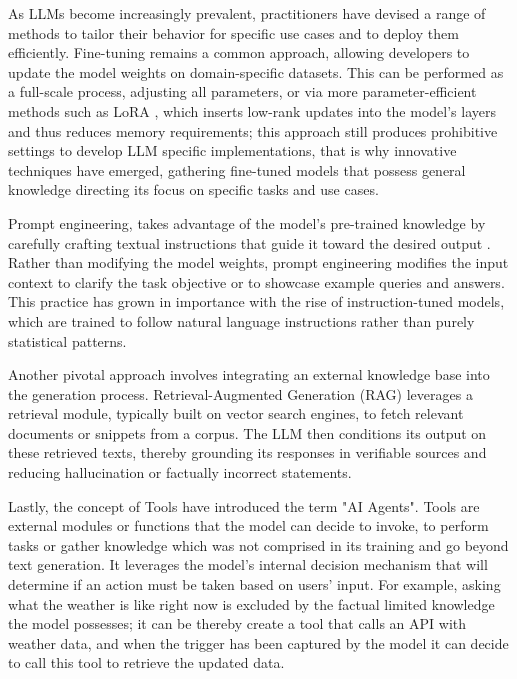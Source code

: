 As LLMs become increasingly prevalent, practitioners have devised a range of methods to tailor their behavior for specific use cases and to deploy them efficiently. Fine-tuning remains a common approach, allowing developers to update the model weights on domain-specific datasets. This can be performed as a full-scale process, adjusting all parameters, or via more parameter-efficient methods such as LoRA \cite{hu2021lora}, which inserts low-rank updates into the model’s layers and thus reduces memory requirements; this approach still produces prohibitive settings to develop LLM specific implementations, that is why innovative techniques have emerged, gathering fine-tuned models that possess general knowledge directing its focus on specific tasks and use cases.

Prompt engineering, takes advantage of the model’s pre-trained knowledge by carefully crafting textual instructions that guide it toward the desired output \cite{liu2023promptsurvey}. Rather than modifying the model weights, prompt engineering modifies the input context to clarify the task objective or to showcase example queries and answers. This practice has grown in importance with the rise of instruction-tuned models, which are trained to follow natural language instructions rather than purely statistical patterns.

Another pivotal approach involves integrating an external knowledge base into the generation process. Retrieval-Augmented Generation (RAG)\cite{lewis2020retrieval} leverages a retrieval module, typically built on vector search engines, to fetch relevant documents or snippets from a corpus. The LLM then conditions its output on these retrieved texts, thereby grounding its responses in verifiable sources and reducing hallucination or factually incorrect statements\cite{ji2023surveyhallucination}.

Lastly, the concept of Tools have introduced the term "AI Agents". Tools are external modules or functions that the model can decide to invoke, to perform tasks or gather knowledge which was not comprised in its training and go beyond text generation. It leverages the model's internal decision mechanism that will determine if an action must be taken based on users' input. For example, asking what the weather is like right now is excluded by the factual limited knowledge the model possesses; it can be thereby create a tool that calls an API with weather data, and when the trigger has been captured by the model it can decide to call this tool to retrieve the updated data.

